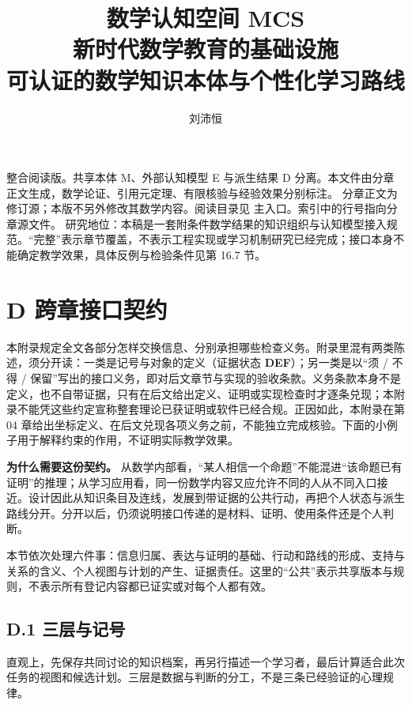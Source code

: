 \documentclass[UTF8,a4paper,zihao=-4,fontset=windows,openany]{ctexbook}
\title{\Huge 数学认知空间 MCS\\[0.7em]\Large 新时代数学教育的基础设施\\[0.45em]\large 可认证的数学知识本体与个性化学习路线}
\author{刘沛恒}
\date{}
\newcommand{\mcsorigin}[1]{\par\noindent{\small\color{black!55}#1}\par\addvspace{0.8em}}
\begin{document}
\maketitle
\thispagestyle{empty}
整合阅读版。共享本体 M、外部认知模型 E 与派生结果 D 分离。本文件由分章正文生成，数学论证、引用元定理、有限核验与经验效果分别标注。
分章正文为修订源；本版不另外修改其数学内容。阅读目录见 主入口。索引中的行号指向分章源文件。
研究地位：本稿是一套附条件数学结果的知识组织与认知模型接入规范。“完整”表示章节覆盖，不表示工程实现或学习机制研究已经完成；接口本身不能确定教学效果，具体反例与检验条件见第 16.7 节。
\tableofcontents
\clearpage
\clearpage\chapter{D 跨章接口契约}
\mcsorigin{原章节：D-接口契约.md}
本附录规定全文各部分怎样交换信息、分别承担哪些检查义务。附录里混有两类陈述，须分开读：一类是记号与对象的定义（证据状态 \textbf{DEF}）；另一类是以“须 / 不得 / 保留”写出的接口义务，即对后文章节与实现的验收条款。义务条款本身不是定义，也不自带证据，只有在后文给出定义、证明或实现检查时才逐条兑现；本附录不能凭这些约定宣称整套理论已获证明或软件已经合规。正因如此，本附录在第 04 章给出坐标定义、在后文兑现各项义务之前，不能独立完成核验。下面的小例子用于解释约束的作用，不证明实际教学效果。

\textbf{为什么需要这份契约。} 从数学内部看，“某人相信一个命题”不能混进“该命题已有证明”的推理；从学习应用看，同一份数学内容又应允许不同的人从不同入口接近。设计因此从知识条目及连线，发展到带证据的公共行动，再把个人状态与派生路线分开。分开以后，仍须说明接口传递的是材料、证明、使用条件还是个人判断。

本节依次处理六件事：信息归属、表达与证明的基础、行动和路线的形成、支持与关系的含义、个人视图与计划的产生、证据责任。这里的“公共”表示共享版本与规则，不表示所有登记内容都已证实或对每个人都有效。

\section{D.1 三层与记号}
直观上，先保存共同讨论的知识档案，再另行描述一个学习者，最后计算适合此次任务的视图和候选计划。三层是数据与判断的分工，不是三条已经验证的心理规律。
\end{document}
